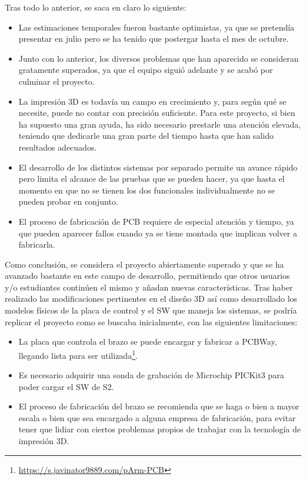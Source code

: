 Tras todo lo anterior, se saca en claro lo siguiente:
\begin{itemize}
    \item Las estimaciones temporales fueron bastante optimistas, ya que se pretendía
    presentar en julio pero se ha tenido que postergar hasta el mes de octubre.

    \item Junto con lo anterior, los diversos problemas que han aparecido se consideran
    gratamente superados, ya que el equipo siguió adelante y se acabó por culminar el
    proyecto.

    \item La impresión 3D es todavía un campo en crecimiento y, para según qué se
    necesite, puede no contar con precisión suficiente. Para este proyecto, si bien
    ha supuesto una gran ayuda, ha sido necesario prestarle una atención elevada,
    teniendo que dedicarle una gran parte del tiempo hasta que han salido resultados
    adecuados.

    \item El desarrollo de los distintos sistemas por separado permite un avance rápido
    pero limita el alcance de las pruebas que se pueden hacer, ya que hasta el momento en
    que no se tienen los dos funcionales individualmente no se pueden probar en conjunto.

    \item El proceso de fabricación de \ac{PCB} requiere de especial atención y tiempo,
    ya que pueden aparecer fallos cuando ya se tiene montada que implican volver a
    fabricarla.
\end{itemize}

Como conclusión, se considera el proyecto abiertamente superado y que se ha avanzado
bastante en este campo de desarrollo, permitiendo que otros usuarios y/o estudiantes
continúen el mismo y añadan nuevas características. Tras haber realizado las
modificaciones pertinentes en el diseño 3D así como desarrollado los modelos físicos
de la placa de control y el \ac{SW} que maneja los sistemas, se podría replicar
el proyecto como se buscaba inicialmente, con las siguientes limitaciones:
\begin{itemize}
    \item La placa que controla el brazo se puede encargar y fabricar a PCBWay,
    llegando lista para ser utilizada\footnote{\url{https://s.javinator9889.com/pArm-PCB}
    \qquad {}}.

    \item Es necesario adquirir una sonda de grabación de Microchip PICKit3 para
    poder cargar el \ac{SW} de \ac{S2}.

    \item El proceso de fabricación del brazo se recomienda que se haga o bien a
    mayor escala o bien que sea encargado a alguna empresa de fabricación, para
    evitar tener que lidiar con ciertos problemas propios de trabajar con
    la tecnología de impresión 3D.
\end{itemize}

